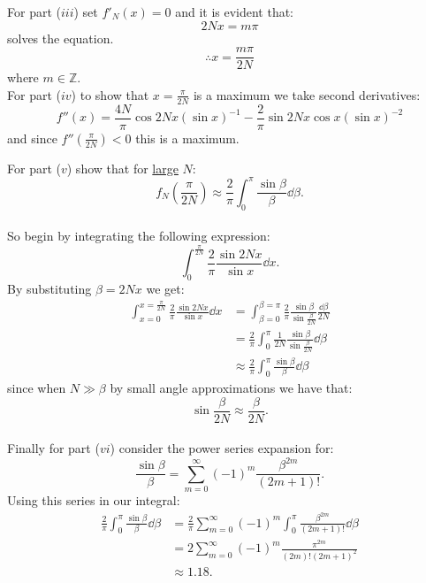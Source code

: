 \begin{enumerate}
    For part ($iii$) set $f'_N(x)=0$ and it is evident that:
    $$2Nx=m\pi$$
    solves the equation.
    $$\therefore x=\frac{m\pi}{2N}$$
    where $m\in\mathbb{Z}$. \\

    For part ($iv$) to show that $x=\displaystyle\frac{\pi}{2N}$
    is a maximum we take second derivatives:
    $$f''(x)=\frac{4N}{\pi}\cos2Nx(\sin x)^{-1}
    -\frac{2}{\pi}\sin 2Nx\cos x (\sin x)^{-2}$$
    and since $f''(\frac{\pi}{2N})<0$ this is a maximum.

    \newpage

    For part ($v$) show that for \underline{large} $N$:
    $$f_N(\frac{\pi}{2N})\approx\frac{2}{\pi}\int_{0}^{\pi}
    \frac{\sin\beta}{\beta}\dd\beta.$$ \\

    So begin by integrating the following expression:
    $$\int_{0}^{\frac{\pi}{2N}}
    \frac{2}{\pi}\frac{\sin2Nx}{\sin x}\dd x.$$
    By substituting $\beta=2Nx$ we get:
    \begin{align*}
        \int_{x=0}^{x=\frac{\pi}{2N}}
        \frac{2}{\pi}\frac{\sin2Nx}{\sin x}\dd x
        &=\int_{\beta=0}^{\beta=\pi}\frac{2}{\pi}
        \frac{\sin\beta}{\sin\frac{\beta}{2N}}
        \frac{\dd\beta}{2N} \\
        &=\frac{2}{\pi}\int_{0}^{\pi}
        \frac{1}{2N}\frac{\sin\beta}{\sin\frac{\beta}{2N}}
        \dd\beta \\
        &\approx\frac{2}{\pi}\int_{0}^{\pi}
        \frac{\sin\beta}{\beta}
        \dd\beta
    \end{align*}
    since when $N\gg\beta$ by small angle approximations
    we have that:
    $$\sin\frac{\beta}{2N}\approx\frac{\beta}{2N}.$$ \\

    Finally for part ($vi$) consider the power series expansion for:
    $$\frac{\sin\beta}{\beta}=\sum_{m=0}^{\infty}
    (-1)^m\frac{\beta^{2m}}{(2m+1)!}.$$
    Using this series in our integral:
    \begin{align*}
        \frac{2}{\pi}\int_{0}^{\pi}
        \frac{\sin\beta}{\beta}
        \dd\beta
        &=\frac{2}{\pi}\sum_{m=0}^{\infty}
        (-1)^m\int_{0}^{\pi}
        \frac{\beta^{2m}}{(2m+1)!}\dd\beta \\
        &=2\sum_{m=0}^{\infty}
        (-1)^m\frac{\pi^{2m}}{(2m)!(2m+1)^2} \\
        &\approx1.18.
    \end{align*}

\end{enumerate}